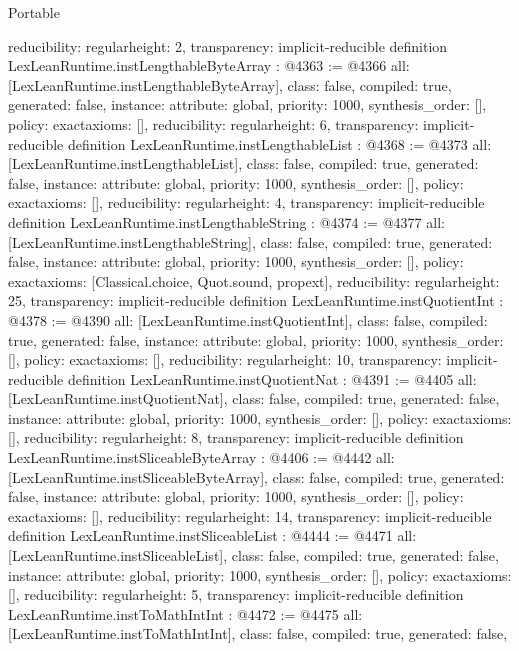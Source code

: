 \begin{lexlean}{Portable}
\begin{coremodule}
{  reducibility: regular{height: 2},
  transparency: implicit-reducible
}
definition LexLeanRuntime.instLengthableByteArray : @4363 := @4366 {
  all: [LexLeanRuntime.instLengthableByteArray],
  class: false,
  compiled: true,
  generated: false,
  instance: {attribute: global, priority: 1000, synthesis_order: []},
  policy: exact{axioms: []},
  reducibility: regular{height: 6},
  transparency: implicit-reducible
}
definition LexLeanRuntime.instLengthableList : @4368 := @4373 {
  all: [LexLeanRuntime.instLengthableList],
  class: false,
  compiled: true,
  generated: false,
  instance: {attribute: global, priority: 1000, synthesis_order: []},
  policy: exact{axioms: []},
  reducibility: regular{height: 4},
  transparency: implicit-reducible
}
definition LexLeanRuntime.instLengthableString : @4374 := @4377 {
  all: [LexLeanRuntime.instLengthableString],
  class: false,
  compiled: true,
  generated: false,
  instance: {attribute: global, priority: 1000, synthesis_order: []},
  policy: exact{axioms: [Classical.choice, Quot.sound, propext]},
  reducibility: regular{height: 25},
  transparency: implicit-reducible
}
definition LexLeanRuntime.instQuotientInt : @4378 := @4390 {
  all: [LexLeanRuntime.instQuotientInt],
  class: false,
  compiled: true,
  generated: false,
  instance: {attribute: global, priority: 1000, synthesis_order: []},
  policy: exact{axioms: []},
  reducibility: regular{height: 10},
  transparency: implicit-reducible
}
definition LexLeanRuntime.instQuotientNat : @4391 := @4405 {
  all: [LexLeanRuntime.instQuotientNat],
  class: false,
  compiled: true,
  generated: false,
  instance: {attribute: global, priority: 1000, synthesis_order: []},
  policy: exact{axioms: []},
  reducibility: regular{height: 8},
  transparency: implicit-reducible
}
definition LexLeanRuntime.instSliceableByteArray : @4406 := @4442 {
  all: [LexLeanRuntime.instSliceableByteArray],
  class: false,
  compiled: true,
  generated: false,
  instance: {attribute: global, priority: 1000, synthesis_order: []},
  policy: exact{axioms: []},
  reducibility: regular{height: 14},
  transparency: implicit-reducible
}
definition LexLeanRuntime.instSliceableList : @4444 := @4471 {
  all: [LexLeanRuntime.instSliceableList],
  class: false,
  compiled: true,
  generated: false,
  instance: {attribute: global, priority: 1000, synthesis_order: []},
  policy: exact{axioms: []},
  reducibility: regular{height: 5},
  transparency: implicit-reducible
}
definition LexLeanRuntime.instToMathIntInt : @4472 := @4475 {
  all: [LexLeanRuntime.instToMathIntInt],
  class: false,
  compiled: true,
  generated: false,
}
\end{coremodule}
\end{lexlean}

